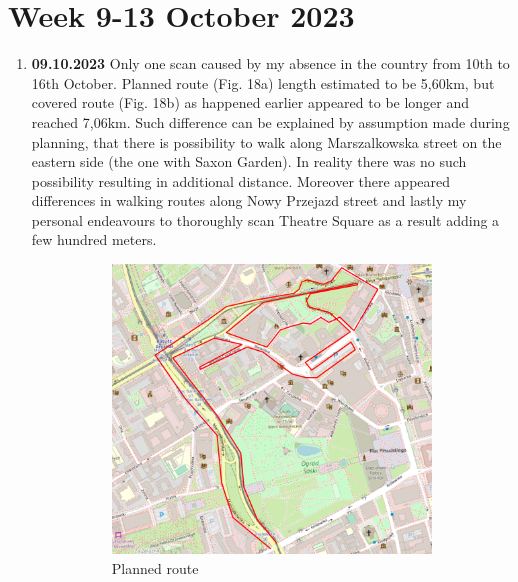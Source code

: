 \documentclass[a4paper,12pt]{article}
\begin{document}
\section{Week 9-13 October 2023}
\begin{enumerate}
	\item \textbf{09.10.2023} Only one scan caused by my absence in the country from 10th to 16th October. Planned route (Fig. 18a) length estimated to be 5,60km, but covered route (Fig. 18b) as happened earlier appeared to be longer and reached 7,06km. Such difference can be explained by assumption made during planning, that there is possibility to walk along Marszalkowska street on the eastern side (the one with Saxon Garden). In reality there was no such possibility resulting in additional distance. Moreover there appeared differences in walking routes along Nowy Przejazd street and lastly my personal endeavours to thoroughly scan Theatre Square as a result adding a few hundred meters.
	\begin{figure}[H]
		\centering
		\begin{subfigure}{.75\textwidth}
			\centering
			\includegraphics[width=1\linewidth]{route_p17}
			\caption{Planned route}
			\label{fig:a17}
		\end{subfigure}%
		\linebreak
		\begin{subfigure}{.75\textwidth}
			\centering

\end{subfigure}
\end{figure}
\end{enumerate}
\end{document}
